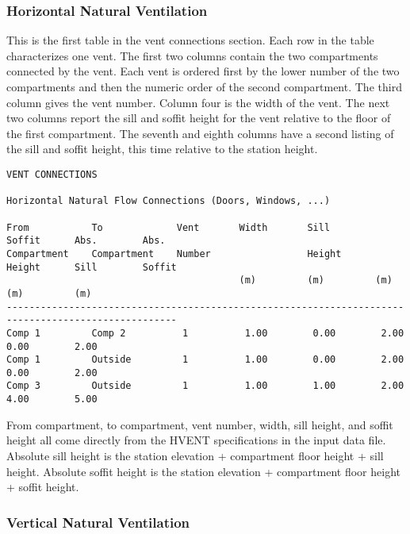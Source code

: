 \subsubsection{Horizontal Natural Ventilation}

This is the first table in the vent connections section.  Each row in the table characterizes one vent.  The first two columns contain the two compartments connected by the vent.  Each vent is ordered first by the lower number of the two compartments and then the numeric order of the second compartment.  The third column gives the vent number.  Column four is the width of the vent.  The next two columns report the sill and soffit height for the vent relative to the floor of the first compartment.  The seventh and eighth columns have a second listing of the sill and soffit height, this time relative to the station height.

\begin{lstlisting}[basicstyle=\tiny]
VENT CONNECTIONS

Horizontal Natural Flow Connections (Doors, Windows, ...)

From           To             Vent       Width       Sill        Soffit      Abs.        Abs.
Compartment    Compartment    Number                 Height      Height      Sill        Soffit
                                         (m)         (m)         (m)         (m)         (m)
----------------------------------------------------------------------------------------------------
Comp 1         Comp 2          1          1.00        0.00        2.00        0.00        2.00
Comp 1         Outside         1          1.00        0.00        2.00        0.00        2.00
Comp 3         Outside         1          1.00        1.00        2.00        4.00        5.00
\end{lstlisting}
From compartment, to compartment, vent number, width, sill height, and soffit height all come directly from the HVENT specifications in the input data file. Absolute sill height is the station elevation + compartment floor height + sill height. Absolute soffit height is the station elevation + compartment floor height + soffit height.

\subsubsection{Vertical Natural Ventilation}

